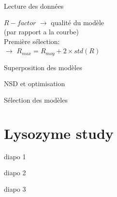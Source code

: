 \documentclass{beamer}
\begin{document}
\begin{frame}{Lecture des donn\'ees}
\begin{minipage}{0.50\linewidth}
\vspace{0.2cm}

$R-factor$ $\longrightarrow$ qualit\'e du mod\`ele\\
(par rapport a la courbe)\\

Premi\`ere s\'election:\\
$\longrightarrow$ $R_{max} = R_{moy} + 2 \times std(R)$
\end{minipage}
\end{frame}

\begin{frame}{Superposition des mod\`eles}
\lipsum[1]
\end{frame}

\begin{frame}{NSD et optimisation}
\lipsum[1]
\end{frame}

\begin{frame}{S\'election des mod\`eles}
\lipsum[1]
\end{frame}

\section{Lysozyme study}

\begin{frame}{diapo 1}
\lipsum[1]
\end{frame}

\begin{frame}{diapo 2}
\lipsum[1]
\end{frame}

\begin{frame}{diapo 3}
\lipsum[1]
\end{frame}
\end{document}
